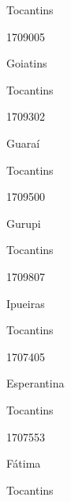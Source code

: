 \documentclass[
  letterpaper,
]{report}
\begin{document}
\n    

\n    

\n      

Tocantins

\n      

1709005

\n      

Goiatins

\n    

\n    

\n      

Tocantins

\n      

1709302

\n      

Guaraí

\n    

\n    

\n      

Tocantins

\n      

1709500

\n      

Gurupi

\n    

\n    

\n      

Tocantins

\n      

1709807

\n      

Ipueiras

\n    

\n    

\n      

Tocantins

\n      

1707405

\n      

Esperantina

\n    

\n    

\n      

Tocantins

\n      

1707553

\n      

Fátima

\n    

\n    

\n      

Tocantins

\n      
\end{document}
